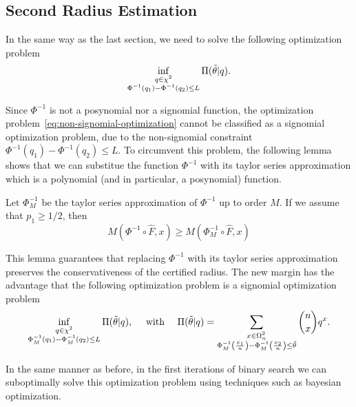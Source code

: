 \subsection{Second Radius Estimation}\label{subsec:second-radius-estimation}
In the same way as the last section, we need to solve the following optimization problem
\begin{equation}
    \inf_{\substack{q\in\chi^{2}\\\Phi^{-1}(q_1)-\Phi^{-1}(q_2)\leq L}}\Pi(\Tilde{\theta}|q).\label{eq:non-signomial-optimization}
\end{equation}

Since $\Phi^{-1}$ is not a posynomial nor a signomial function, the optimization problem~\eqref{eq:non-signomial-optimization} cannot be classified as a signomial optimization problem, due to the non-signomial constraint $\Phi^{-1}(q_1)-\Phi^{-1}(q_2)\leq L$.
To circumvent this problem, the following lemma shows that we can substitue the function $\Phi^{-1}$ with its taylor series approximation which is a polynomial (and in particular, a posynomial) function.
\begin{lemma}
    \label{lemma:approximation}
    Let $\Phi^{-1}_M$ be the taylor series approximation of $\Phi^{-1}$ up to order $M$.
    If we assume that $p_1\geq1/2$, then
    \[
        M(\Phi^{-1}\circ\hat{F},x) \geq M(\Phi^{-1}_M\circ\hat{F},x)
    \]
\end{lemma}
This lemma guarantees that replacing $\Phi^{-1}$ with its taylor series approximation preserves the conservativeness of the certified radius.
The new margin has the advantage that the following optimization problem is a signomial optimization problem
\begin{equation}
    \inf_{\substack{q\in\chi^{2}\\\Phi^{-1}_M(q_1)-\Phi^{-1}_M(q_2)\leq L}}\Pi(\Tilde{\theta}|q),\quad\text{ with }\quad\Pi(\Tilde{\theta}|q)= \sum_{\substack{x\in\Omega^{2}_n\\\Phi^{-1}_M\left(\frac{x_1}{n}\right)-\Phi^{-1}_M\left(\frac{x_2}{n}\right)\leq\Tilde{\theta}}}\binom{n}{x}q^x.\label{eq:approximated-signomial-optimization}
\end{equation}

In the same manner as before, in the first iterations of binary search we can suboptimally solve this optimization problem using techniques such as bayesian optimization.

